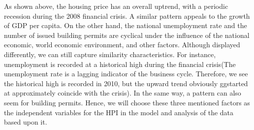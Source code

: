 \documentclass[11pt]{article}
\begin{document}
\begin{figure}[H]
\captionsetup[subfigure]{labelformat=empty}
\centering
{}
\end{figure}

As shown above, the housing price has an overall uptrend, with a periodic recession during the 2008 financial crisis. A similar pattern appeals to the growth of GDP per capita. On the other hand, the national unemployment rate and the number of issued building permits are cyclical under the influence of the national economic, world economic environment, and other factors. Although displayed differently, we can still capture similarity characteristics. For instance, unemployment is recorded at a historical high during the financial crisis(The unemployment rate is a lagging indicator of the business cycle. Therefore, we see the historical high is recorded in 2010, but the upward trend obviously ggstarted at approximately coincide with the crisis). In the same way, a pattern can also seem for building permits. 
Hence, we will choose these three mentioned factors as the independent variables for the HPI in the model and analysis of the data based upon it.  
\end{document}
